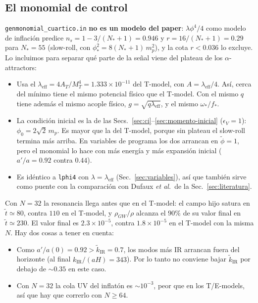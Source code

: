         \subsection{El monomial de control}
            \label{sec:control}

            \texttt{genmonomial\_cuartico.in} \textbf{no es un modelo del paper}: $\lambda\phi^4/4$ como modelo de inflación predice $n_s = 1 - 3/(N_*+1) = 0.946$ y $r = 16/(N_*+1) = 0.29$ para $N_* = 55$ (slow-roll, con $\phi_*^2 = 8(N_*+1)\,m_p^2$), y la cota $r < 0.036$ lo excluye. Lo incluimos para separar qué parte de la señal viene del plateau de los $\alpha$-attractors:
            \begin{itemize}
                \item Usa el $\lambda_{\text{eff}} = 4A_T/M_T^4 = 1.333 \times 10^{-11}$ del T-model, con $A = \lambda_{\text{eff}}/4$. Así, cerca del mínimo tiene el mismo potencial físico que el T-model. Con el mismo $q$ tiene además el mismo acople físico, $g = \sqrt{q\lambda_{\text{eff}}}$, y el mismo $\omega_*/f_*$.
                \item La condición inicial es la de las Secs.~\ref{sec:ci}--\ref{sec:momento-inicial} ($\epsilon_V = 1$): $\phi_0 = 2\sqrt 2\, m_p$. Es mayor que la del T-model, porque sin plateau el slow-roll termina más arriba. En variables de programa los dos arrancan en $\tilde\phi = 1$, pero el monomial lo hace con más energía y más expansión inicial ($a'/a = 0.92$ contra $0.44$).
                \item Es idéntico a \texttt{lphi4} con $\lambda = \lambda_{\text{eff}}$ (Sec.~\ref{sec:variables}), así que también sirve como puente con la comparación con Dufaux \emph{et al.}\ de la Sec.~\ref{sec:literatura}.
            \end{itemize}
            Con $N = 32$ la resonancia llega antes que en el T-model: el campo hijo satura en $\tilde t \simeq 80$, contra $110$ en el T-model, y $\rho_{GW}/\rho$ alcanza el $90\%$ de su valor final en $\tilde t \simeq 230$. El valor final es $2.3 \times 10^{-5}$, contra $1.8 \times 10^{-5}$ en el T-model con la misma $N$. Hay dos cosas a tener en cuenta:
            \begin{itemize}
                \item Como $a'/a(0) = 0.92 > \tilde k_{\text{IR}} = 0.7$, los modos más IR arrancan fuera del horizonte (al final $k_{\text{IR}}/(aH) = 343$). Por lo tanto no conviene bajar $\tilde k_{\text{IR}}$ por debajo de $\sim 0.35$ en este caso.
                \item Con $N = 32$ la cola UV del inflatón es $\sim 10^{-3}$, peor que en los T/E-models, así que hay que correrlo con $N \ge 64$.
            \end{itemize}

